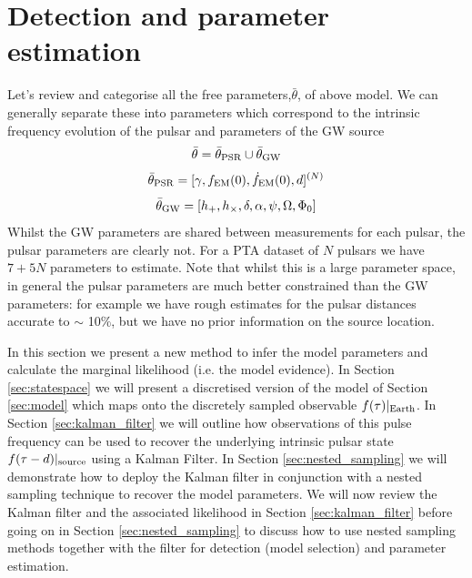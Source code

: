 \documentclass[fleqn,usenatbib,useAMS]{mnras}
\begin{document}
\section{Detection and parameter estimation} \label{sec:detect}
Let's review and categorise all the free parameters,$\bar{\theta}$, of above model. We can generally separate these into parameters which correspond to the intrinsic frequency evolution of the pulsar and parameters of the GW source
\begin{equation}
	\bar{\theta} =  \bar{\theta}_{\rm PSR} \cup \bar{\theta}_{\rm GW}
\end{equation}
\begin{equation}
	\bar{\theta}_{\rm PSR} = [\gamma, f_{\rm EM}(0), \dot{f}_{\rm EM}(0),d]^{(N)}
\end{equation}
\begin{equation}
	\bar{\theta}_{\rm GW} = [h_{+}, h_{\times}, \delta, \alpha, \psi, \Omega, \Phi_0]
\end{equation}
Whilst the GW parameters are shared between measurements for each pulsar, the pulsar parameters are clearly not. For a PTA dataset of $N$ pulsars we have $7 + 5N$ parameters to estimate. Note that whilst this is a large parameter space, in general the pulsar parameters are much better constrained than the GW parameters: for example we have rough estimates for the pulsar distances accurate to $\sim$ 10$\%$, but we have no prior information on the source location. \newline 


In this section we present a new method to infer the model parameters and calculate the marginal likelihood (i.e. the model evidence). In Section \ref{sec:statespace} we will present a discretised version of the model of Section \ref{sec:model} which maps onto the discretely sampled observable $f(\tau)|_{\rm Earth}$. In Section \ref{sec:kalman_filter} we will outline how observations of this pulse frequency can be used to recover the underlying intrinsic pulsar state $f(\tau -d)|_{\rm source}$ using a Kalman Filter. In Section \ref{sec:nested_sampling} we will demonstrate how to deploy the Kalman filter in conjunction with a nested sampling technique to recover the model parameters. We will now review the Kalman filter and the associated likelihood in Section \ref{sec:kalman_filter} before going on in Section \ref{sec:nested_sampling} to discuss how to use nested sampling methods together with the filter for detection (model selection) and parameter estimation. 
\end{document}
